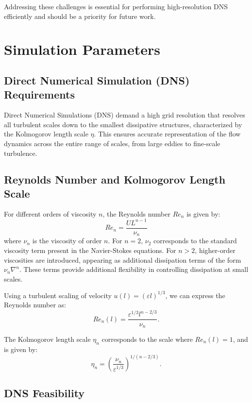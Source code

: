 \documentclass[final,5p,times,twocolumn,authoryear]{elsarticle}
\begin{document}
Addressing these challenges is essential for performing high-resolution DNS efficiently and should be a priority for future work.

\section{Simulation Parameters}

\subsection{Direct Numerical Simulation (DNS) Requirements}

Direct Numerical Simulations (DNS) demand a high grid resolution that resolves all turbulent scales down to the smallest dissipative structures, characterized by the Kolmogorov length scale $\eta$. This ensures accurate representation of the flow dynamics across the entire range of scales, from large eddies to fine-scale turbulence. 

\subsection{Reynolds Number and Kolmogorov Length Scale}

For different orders of viscosity $n$, the Reynolds number $Re_n$ is given by:
\begin{equation*}
    Re_n = \frac{U L^{n-1}}{\nu_n}
\end{equation*}
where $\nu_n$ is the viscosity of order $n$. For $n=2$, $\nu_2$ corresponds to the standard viscosity term present in the Navier-Stokes equations. For $n>2$, higher-order viscosities are introduced, appearing as additional dissipation terms of the form $\nu_n \nabla^n$. These terms provide additional flexibility in controlling dissipation at small scales.

Using a turbulent scaling of velocity $u(l) = (\varepsilon l)^{1/3}$, we can express the Reynolds number as:
\begin{equation*}
    Re_n(l) = \frac{\varepsilon^{1/3} l^{n - 2/3}}{\nu_n}.
\end{equation*}

The Kolmogorov length scale $\eta_n$ corresponds to the scale where $Re_n(l) = 1$, and is given by:
\begin{equation*}
    \eta_n = \left(\frac{\nu_n}{\varepsilon^{1/3}}\right)^{1 / (n - 2/3)}.
\end{equation*}

\subsection{DNS Feasibility}
\end{document}
